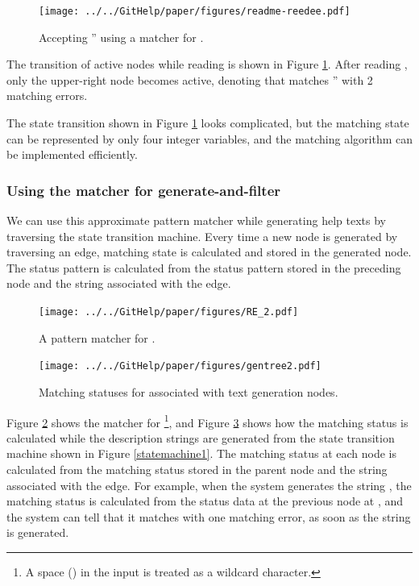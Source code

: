 \documentclass[manuscript,anonymous,review]{acmart}
\begin{document}
\begin{figure}[htb]
  \centerline{\texttt{[image: ../../GitHelp/paper/figures/readme-reedee.pdf]}}
  \caption{Accepting '' using a matcher for .}
  \label{readme-reedee}
\end{figure}

The transition of active nodes while reading
 is shown in Figure \ref{readme-reedee}.
After reading ,
only the upper-right node becomes active,
denoting that  matches
'' with 2 matching errors.

The state transition shown in 
Figure \ref{readme-reedee} looks complicated, but
the matching state can be represented by only four integer variables, and
the matching algorithm can be implemented efficiently.

\subsubsection{Using the matcher for generate-and-filter}

We can use this approximate pattern matcher while generating
help texts by traversing the state transition machine.
%
Every time a new node is generated by traversing an edge,
matching state is calculated and stored in the generated node.
The status pattern is calculated from the status pattern
stored in the preceding node and the string associated with the edge.

\begin{figure}[htb]
  \centerline{\texttt{[image: ../../GitHelp/paper/figures/RE\_2.pdf]}}
  \caption{A pattern matcher for .}
  \label{RE_2}
\end{figure}

\begin{figure}[bth]
\centerline{\texttt{[image: ../../GitHelp/paper/figures/gentree2.pdf]}}
\caption{Matching statuses for  associated with text generation nodes.}
\label{gentree2}
\end{figure}

Figure \ref{RE_2} shows the matcher for \footnote{
  A space (\qtt{ }) in the input is treated as a wildcard character.
},
and Figure \ref{gentree2} shows how the matching status is calculated while the
description strings are generated from the state transition machine
shown in Figure \ref{statemachine1}.
The matching status at each node is calculated from the matching status
stored in the parent node and the string associated with the edge.
For example, when the system generates the string
,
the matching status is calculated from the status data at the previous node at
, and
the system can tell that it matches  with one matching error,
as soon as the string is generated.
\end{document}
